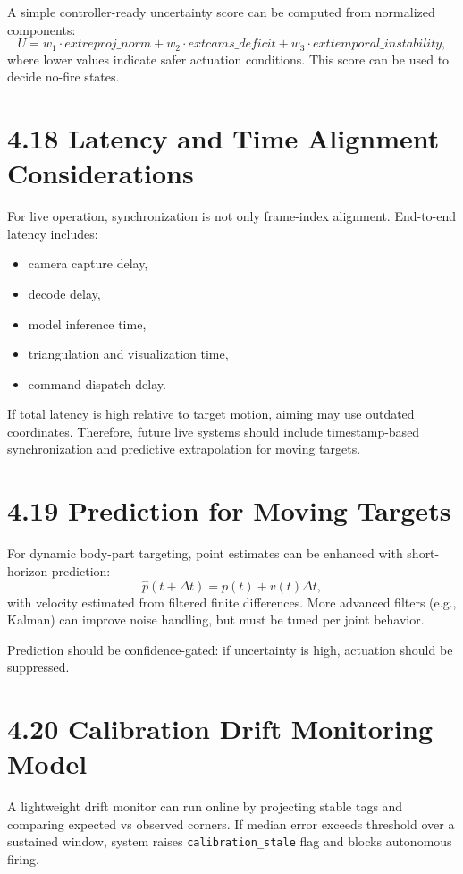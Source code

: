 A simple controller-ready uncertainty score can be computed from normalized components:
\[
U = w_1\cdot	ext{reproj\_norm} + w_2\cdot	ext{cams\_deficit} + w_3\cdot	ext{temporal\_instability},
\]
where lower values indicate safer actuation conditions. This score can be used to decide no-fire states.

\section{4.18 Latency and Time Alignment Considerations}
For live operation, synchronization is not only frame-index alignment. End-to-end latency includes:
\begin{itemize}
  \item camera capture delay,
  \item decode delay,
  \item model inference time,
  \item triangulation and visualization time,
  \item command dispatch delay.
\end{itemize}

If total latency is high relative to target motion, aiming may use outdated coordinates. Therefore, future live systems should include timestamp-based synchronization and predictive extrapolation for moving targets.

\section{4.19 Prediction for Moving Targets}
For dynamic body-part targeting, point estimates can be enhanced with short-horizon prediction:
\[
\hat{p}(t+\Delta t)=p(t)+v(t)\Delta t,
\]
with velocity estimated from filtered finite differences. More advanced filters (e.g., Kalman) can improve noise handling, but must be tuned per joint behavior.

Prediction should be confidence-gated: if uncertainty is high, actuation should be suppressed.

\section{4.20 Calibration Drift Monitoring Model}
A lightweight drift monitor can run online by projecting stable tags and comparing expected vs observed corners. If median error exceeds threshold over a sustained window, system raises \texttt{calibration\_stale} flag and blocks autonomous firing.

